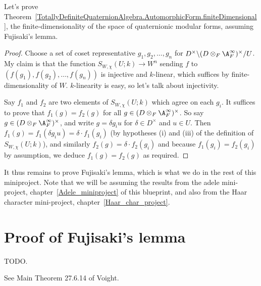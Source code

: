 Let's prove Theorem~\ref{TotallyDefiniteQuaternionAlgebra.AutomorphicForm.finiteDimensional},
the finite-dimensionality of the space of quaternionic modular forms,
assuming Fujisaki's lemma.
\begin{proof}
  Choose a set of coset representative $g_1,g_2,\ldots,g_n$ for
  $D^\times\backslash(D\otimes_F\A_F^\infty)^\times/U$. My claim is that
  the function $S_{W,\chi}(U;k)\to W^n$ sending $f$ to $(f(g_1),f(g_2),\ldots,f(g_n))$
  is injective and $k$-linear, which suffices by finite-dimensionality of $W$.
  $k$-linearity is easy, so let's talk about injectivity.

  Say $f_1$ and $f_2$ are two elements of $S_{W,\chi}(U;k)$ which agree on
  each $g_i$. It suffices to prove that $f_1(g)=f_2(g)$ for all
  $g\in(D\otimes_F\A_F^\infty)^\times$. So say $g\in(D\otimes_F\A_F^\infty)^\times$,
  and write $g=\delta g_iu$ for $\delta \in D^\times$ and $u\in U$.
  Then $f_1(g)=f_1(\delta g_iu)=\delta\cdot f_1(g_i)$ (by hypotheses (i) and (iii)
  of the definition of $S_{W,\chi}(U;k)$), and similarly $f_2(g)=\delta\cdot f_2(g_i)$
  and because $f_1(g_i)=f_2(g_i)$ by assumption, we deduce $f_1(g)=f_2(g)$ as required.
\end{proof}

It thus remains to prove Fujisaki's lemma, which is what we do in the rest of this
miniproject. Note that we will be assuming the results
from the adele mini-project, chapter~\ref{Adele_miniproject} of this blueprint,
and also from the Haar character mini-project, chapter~\ref{Haar_char_project}.

\section{Proof of Fujisaki's lemma}

TODO.

See Main Theorem 27.6.14 of Voight.
